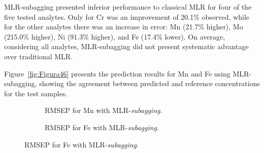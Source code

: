 \documentclass[12pt]{article}
\newcommand{\namostras}{Nº de amostras}
\newcommand{\oautor}{o autor}
\begin{document}
MLR-subagging presented inferior performance to classical MLR for four of the five tested analytes. Only for Cr was an improvement of 20.1\% observed, while for the other analytes there was an increase in error: Mn (21.7\% higher), Mo (215.0\% higher), Ni (91.3\% higher), and Fe (17.4\% lower). On average, considering all analytes, MLR-subagging did not present systematic advantage over traditional MLR.

Figure~\ref{fig:Figura46} presents the prediction results for Mn and Fe using MLR-subagging, showing the agreement between predicted and reference concentrations for the test samples.

\begin{figure}[htbp]
\centering
\caption{RMSEP for Mn and Fe with \textit{subagging}.}
\label{fig:Figura46}

\begin{subfigure}{0.48\textwidth}
\centering
{}
\caption{RMSEP for Mn with MLR-\textit{subagging}.}
\label{fig:Figura45a}
\end{subfigure}
\hfill
\begin{subfigure}{0.48\textwidth}
\centering
{}
\caption{RMSEP for Fe with MLR-\textit{subagging}.}
\label{fig:Figura45b}
\end{subfigure}
\end{figure}
\end{document}
